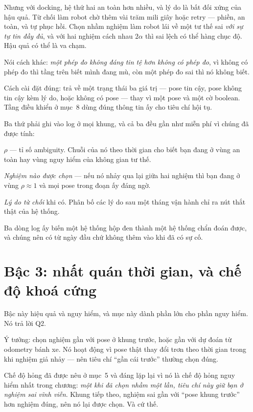 \documentclass[../../marker.tex]{subfiles}
\begin{document}
Nhưng với docking, hệ thứ hai an toàn hơn nhiều, và lý do là bất đối xứng của hậu quả. Từ chối làm robot chờ thêm vài trăm mili giây hoặc retry --- phiền, an toàn, và tự phục hồi. Chọn nhầm nghiệm làm robot lái về một tư thế sai \emph{với sự tự tin đầy đủ}, và với hai nghiệm cách nhau \(2\alpha\) thì sai lệch có thể hàng chục độ. Hậu quả có thể là va chạm.

Nói cách khác: \emph{một phép đo không đáng tin tệ hơn không có phép đo}, vì không có phép đo thì tầng trên biết mình đang mù, còn một phép đo sai thì nó không biết.

Cách cài đặt đúng: trả về một trạng thái ba giá trị --- pose tin cậy, pose không tin cậy kèm lý do, hoặc không có pose --- thay vì một pose và một cờ boolean. Tầng điều khiển ở  mục~8 dùng đúng thông tin ấy cho tiêu chí hội tụ.

\begin{cannho}
Ba thứ phải ghi vào log ở mọi khung, và cả ba đều gần như miễn phí vì chúng đã được tính:

\(\rho\) --- tỉ số ambiguity. Chuỗi của nó theo thời gian cho biết bạn đang ở vùng an toàn hay vùng nguy hiểm của không gian tư thế.

\emph{Nghiệm nào được chọn} --- nếu nó nhảy qua lại giữa hai nghiệm thì bạn đang ở vùng \(\rho \approx 1\) và mọi pose trong đoạn ấy đáng ngờ.

\emph{Lý do từ chối} khi có. Phân bố các lý do sau một tháng vận hành chỉ ra nút thắt thật của hệ thống.

Ba dòng log ấy biến một hệ thống hộp đen thành một hệ thống chẩn đoán được, và chúng nên có từ ngày đầu chứ không thêm vào khi đã có sự cố.
\end{cannho}

\section{Bậc 3: nhất quán thời gian, và chế độ khoá cứng}

Bậc này hiệu quả và nguy hiểm, và mục này dành phần lớn cho phần nguy hiểm. Nó trả lời Q2.

Ý tưởng: chọn nghiệm gần với pose ở khung trước, hoặc gần với dự đoán từ odometry bánh xe. Nó hoạt động vì pose thật thay đổi trơn theo thời gian trong khi nghiệm giả nhảy --- nên tiêu chí ``gần cái trước'' thường chọn đúng.

Chế độ hỏng đã được nêu ở  mục~5 và đáng lặp lại vì nó là chế độ hỏng nguy hiểm nhất trong chương: \emph{một khi đã chọn nhầm một lần, tiêu chí này giữ bạn ở nghiệm sai vĩnh viễn}. Khung tiếp theo, nghiệm sai gần với ``pose khung trước'' hơn nghiệm đúng, nên nó lại được chọn. Và cứ thế.
\end{document}
